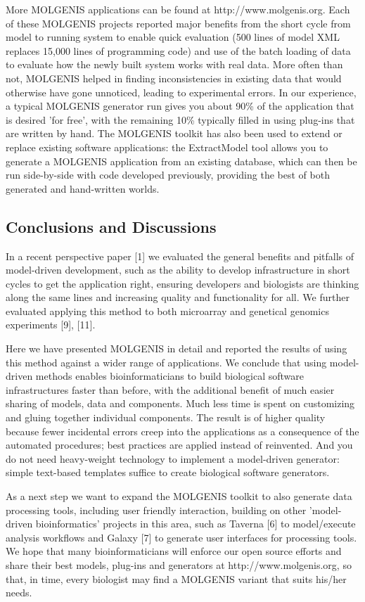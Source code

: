 More MOLGENIS applications can be found at http://www.molgenis.org. Each of these MOLGENIS projects 
reported major benefits from the short cycle from model to running system to enable quick evaluation 
(500 lines of model XML replaces 15,000 lines of programming code) and use of the batch loading of 
data to evaluate how the newly built system works with real data. More often than not, MOLGENIS 
helped in finding inconsistencies in existing data that would otherwise have gone unnoticed, leading 
to experimental errors. In our experience, a typical MOLGENIS generator run gives you about 90\% of 
the application that is desired 'for free', with the remaining 10\% typically filled in using plug-ins 
that are written by hand. The MOLGENIS toolkit has also been used to extend or replace existing 
software applications: the ExtractModel tool allows you to generate a MOLGENIS application from an 
existing database, which can then be run side-by-side with code developed previously, providing the 
best of both generated and hand-written worlds.

\subsection{Conclusions and Discussions}
In a recent perspective paper [1] we evaluated the general benefits and pitfalls of model-driven 
development, such as the ability to develop infrastructure in short cycles to get the application 
right, ensuring developers and biologists are thinking along the same lines and increasing quality 
and functionality for all. We further evaluated applying this method to both microarray and genetical 
genomics experiments [9], [11].

Here we have presented MOLGENIS in detail and reported the results of using this method against a 
wider range of applications. We conclude that using model-driven methods enables bioinformaticians 
to build biological software infrastructures faster than before, with the additional benefit of 
much easier sharing of models, data and components. Much less time is spent on customizing and gluing 
together individual components. The result is of higher quality because fewer incidental errors creep 
into the applications as a consequence of the automated procedures; best practices are applied 
instead of reinvented. And you do not need heavy-weight technology to implement a model-driven 
generator: simple text-based templates suffice to create biological software generators.

As a next step we want to expand the MOLGENIS toolkit to also generate data processing tools, 
including user friendly interaction, building on other 'model-driven bioinformatics' projects 
in this area, such as Taverna [6] to model/execute analysis workflows and Galaxy [7] to generate 
user interfaces for processing tools. We hope that many bioinformaticians will enforce our open 
source efforts and share their best models, plug-ins and generators at http://www.molgenis.org, 
so that, in time, every biologist may find a MOLGENIS variant that suits his/her needs.

